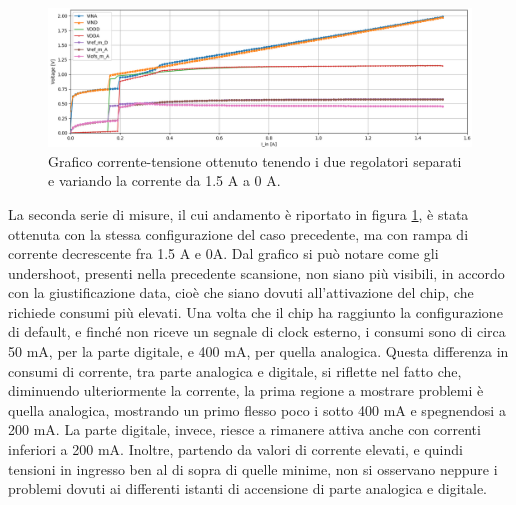 \begin{figure}
\centering
\includegraphics[width=\textwidth]{Immagini/IDI2}
\caption{Grafico corrente-tensione ottenuto tenendo i due regolatori separati e variando la corrente da 1.5 A a 0 A.}
\label{IDI}
\end{figure}

La seconda serie di misure, il cui andamento è riportato in figura \ref{IDI}, è stata ottenuta con la stessa configurazione del caso precedente, ma con rampa di corrente decrescente fra 1.5 A e 0A.
Dal grafico si può notare come gli undershoot, presenti nella precedente scansione, non siano più visibili, in accordo con la giustificazione data, cioè che siano dovuti all'attivazione del chip, che richiede consumi più elevati. 
Una volta che il chip ha raggiunto la configurazione di default, e finché non riceve un segnale di clock esterno, i consumi sono di circa 50 mA, per la parte digitale, e 400 mA, per quella analogica.
Questa differenza in consumi di corrente, tra parte analogica e digitale, si riflette nel fatto che, diminuendo ulteriormente la corrente, la prima regione a mostrare problemi è quella analogica, mostrando un primo flesso poco i sotto 400 mA e spegnendosi a 200 mA.
La parte digitale, invece, riesce a rimanere attiva anche con correnti inferiori a 200 mA. 
Inoltre, partendo da valori di corrente elevati, e quindi tensioni in ingresso ben al di sopra di quelle minime, non si osservano neppure i problemi dovuti ai differenti istanti di accensione di parte analogica e digitale.
% 
%
%

